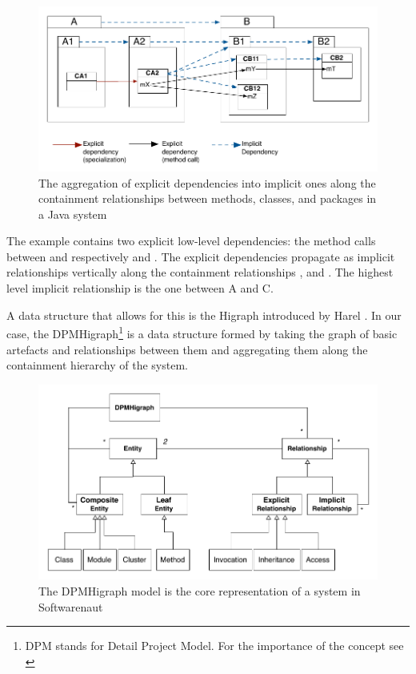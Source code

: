 \documentclass[preprint,12pt]{elsarticle}
\begin{document}
\begin{figure}[ht]
\begin{center}
\includegraphics[width=0.9\linewidth]{DependencyAggregation}
\caption{The aggregation of explicit dependencies into implicit ones along the containment relationships between methods, classes, and packages in a Java system}
\end{center}
\end{figure}

The example contains two explicit low-level dependencies: the method calls between  and respectively  and . The explicit dependencies propagate as implicit relationships vertically along the containment relationships ,  and . The highest level implicit relationship is the one between A and C. 

A data structure that allows for this is the Higraph introduced by Harel \cite{harel-visform}. In our case, the DPMHigraph\footnote{DPM stands for Detail Project Model. For the importance of the concept see  \cite{lungu-thesis}} is a data structure formed by taking the graph of basic artefacts and relationships between them and aggregating them along the containment hierarchy of the system. 

\begin{figure}[h]
\begin{center}
\includegraphics[width=0.9\linewidth]{HigraphModel}
\caption{The DPMHigraph model is the core representation of a system in Softwarenaut}
\end{center}
\end{figure}
\end{document}
